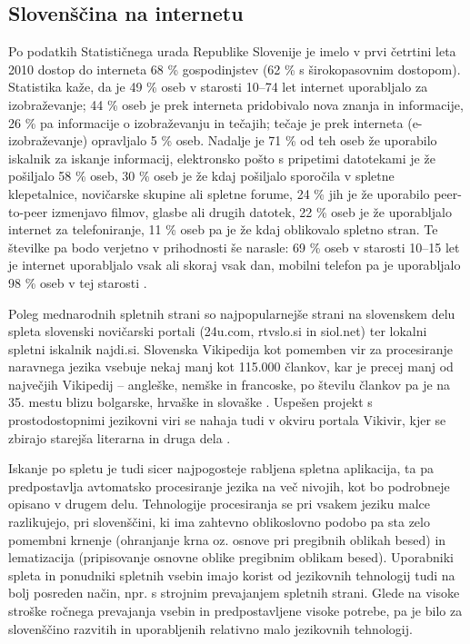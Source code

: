 \begin{multicols}{2}
\subsection{Slovenščina na internetu}

Po podatkih Statističnega urada Republike Slovenije je imelo v prvi četrtini leta 2010 dostop do interneta 68 \% gospodinjstev (62 \% s širokopasovnim dostopom). Statistika kaže, da je 49 \% oseb v starosti 10–74 let internet uporab\-ljalo za izobraževanje; 44 \% oseb je prek interneta pridobivalo nova znanja in informacije, 26 \% pa informacije o izobraževanju in tečajih; tečaje je prek interneta (e-izobraževanje) oprav\-ljalo 5 \% oseb. Nadalje je 71 \% od teh oseb že uporabilo iskalnik za iskanje informacij, elektronsko pošto s pripetimi datotekami je že pošiljalo 58 \% oseb, 30 \% oseb je že kdaj pošiljalo sporočila v spletne klepetalnice, novičarske skupine ali spletne forume, 24 \% jih je že uporabilo peer-to-peer izmenjavo filmov, glasbe ali drugih datotek, 22 \% oseb je že uporab\-ljalo internet za telefoniranje, 11 \% oseb pa je že kdaj oblikovalo spletno stran. Te številke pa bodo verjetno v prihodnosti še narasle: 69 \% oseb v starosti 10–15 let je internet uporab\-ljalo vsak ali skoraj vsak dan, mobilni telefon pa je uporab\-ljalo 98 \% oseb v tej starosti \cite{SURS3}. 

Poleg mednarodnih spletnih strani so naj\-popularnejše strani na slovenskem delu spleta slovenski novičarski portali (24u.com, rtvslo.si in siol.net) ter lokalni spletni iskalnik najdi.si. Slovenska Vikipedija kot pomemben vir za procesiranje na\-ravnega jezika vsebuje nekaj manj kot 115.000 člankov, kar je precej manj od naj\-večjih Vikipedij – angleške, nemške in francoske, po številu člankov pa je na 35. mestu blizu bolgarske, hrvaške in slovaške \cite{Wiki1}.  Uspešen projekt s prostodostopnimi jezikovni viri se nahaja tudi v okviru portala Vikivir, kjer se zbirajo starejša literarna in druga dela \cite{Wiki2}.  


Iskanje po spletu je tudi sicer naj\-pogosteje rab\-ljena spletna aplikacija, ta pa predpostav\-lja avtomatsko procesiranje jezika na več nivojih, kot bo podrobneje opisano v drugem delu. Tehnologije procesiranja se pri vsakem jeziku malce razlikujejo, pri slovenščini, ki ima zah\-tevno oblikoslovno podobo pa sta zelo pomembni krnenje (ohranjanje krna oz. osnove pri pregibnih oblikah besed) in lematizacija (pripisovanje osnovne oblike pregibnim oblikam besed). Uporabniki spleta in ponudniki spletnih vsebin imajo korist od jezikovnih tehnologij tudi na bolj posreden način, npr. s stroj\-nim prevajanjem spletnih strani. Glede na visoke stroške ročnega prevajanja vsebin in predpostav\-ljene visoke potrebe, pa je bilo za slovenščino razvitih in uporab\-ljenih relativno malo jezikovnih tehnologij. 


\end{multicols}
